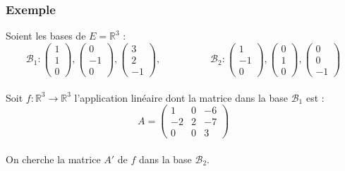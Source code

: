 \documentclass[a4paper,10pt]{book} %
\newcommand{\R}{\mathbb{R}}
\newcommand{\B}{\mathcal{B}}
\begin{document}
\newpage

\subsubsection{Exemple}
Soient les bases de $E=\mathbb{R}^3$ :
$$\B_1 : \begin{pmatrix} 1 \\ 1 \\ 0 \end{pmatrix}, 
\begin{pmatrix} 0 \\ -1 \\ 0 \end{pmatrix}, 
\begin{pmatrix} 3 \\ 2 \\ -1 \end{pmatrix}, 
\hspace{5em}
\B_2 : \begin{pmatrix} 1 \\ -1 \\ 0 \end{pmatrix},
\begin{pmatrix} 0 \\ 1 \\ 0 \end{pmatrix},
\begin{pmatrix} 0 \\ 0 \\ -1 \end{pmatrix}$$\\

Soit $f:\R^3 \rightarrow \R^3$ l'application linéaire dont la matrice dans la base $\B_1$ est :
$$A=\begin{pmatrix} 1 & 0 & -6 \\ -2 & 2 & -7 \\ 0 & 0 & 3 \end{pmatrix}$$\\

On cherche la matrice $A'$ de $f$ dans la base $\B_2$.\\
\end{document}
